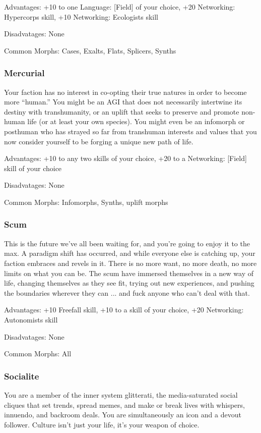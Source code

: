 Advantages: +10 to one Language: [Field] of your choice, +20 Networking:
Hypercorps skill, +10 Networking: Ecologists skill

Disadvatages: None

Common Morphs: Cases, Exalts, Flats, Splicers, Synths

\subsubsection{Mercurial}
Your faction has no interest in co-opting their true natures in order to become
more “human.” You might be an AGI that does not necessarily intertwine its
destiny with transhumanity, or an uplift that seeks to preserve and promote
non-human life (or at least your own species). You might even be an infomorph
or posthuman who has strayed so far from transhuman interests and values that
you now consider yourself to be forging a unique new path of life.

Advantages: +10 to any two skills of your choice, +20 to a Networking: [Field]
skill of your choice

Disadvatages: None

Common Morphs: Infomorphs, Synths, uplift morphs

\subsubsection{Scum}
This is the future we’ve all been waiting for, and you’re going to enjoy it to
the max. A paradigm shift has occurred, and while everyone else is catching up,
your faction embraces and revels in it. There is no more want, no more death,
no more limits on what you can be. The scum have immersed themselves in a new
way of life, changing themselves as they see fit, trying out new experiences,
and pushing the boundaries wherever they can ... and fuck anyone who can’t deal
with that.

Advantages: +10 Freefall skill, +10 to a skill of your choice, +20 Networking:
Autonomists skill

Disadvatages: None

Common Morphs: All

\subsubsection{Socialite}
You are a member of the inner system glitterati, the media-saturated social
cliques that set trends, spread memes, and make or break lives with whispers,
innuendo, and backroom deals. You are simultaneously an icon and a devout
follower. Culture isn’t just your life, it’s your weapon of choice.


